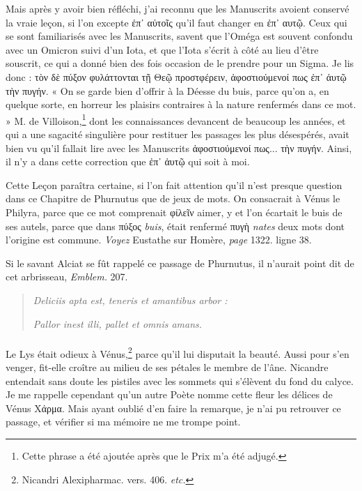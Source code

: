 \documentclass[a4paper, 11pt, oneside, polutonikogreek, french]{article}
\begin{document}
Mais après y avoir bien réfléchi, j'ai reconnu que les Manuscrits avoient conservé la vraie leçon, si l'on excepte ἐπ᾽ αὐτοῖς qu'il faut changer en ἐπ᾽ αυτῷ. Ceux qui se sont familiarisés avec les Manuscrits, savent que l'Oméga est souvent confondu avec un Omicron suivi d'un Iota, et que l'Iota s'écrit à côté au lieu d'être souscrit, ce qui a donné bien des fois occasion de le prendre pour un Sigma. Je lis donc : τὸν δὲ πύξον φυλάττονται τῇ Θεῷ προστφέρειν, ἀφοστιούμενοί πως ἐπ᾿ ἀυτῷ τὴν πυγήν. « On se garde bien d'offrir à la Déesse du buis, parce qu'on a, en quelque sorte, en horreur les plaisirs contraires à la nature renfermés dans ce mot. » M. de Villoison,\footnote{Cette phrase a été ajoutée après que le Prix m'a été adjugé.} dont les connaissances devancent de beaucoup les années, et qui a une sagacité singulière pour restituer les passages les plus désespérés, avait bien vu qu'il fallait lire avec les Manuscrits ἀφοστιούμενοί πως... τὴν πυγήν. Ainsi, il n'y a dans cette correction que ἐπ᾿ ἀυτῷ qui soit à moi.

Cette Leçon paraîtra certaine, si l'on fait attention qu'il n'est presque question dans ce Chapitre de Phurnutus que de jeux de mots. On consacrait à Vénus le Philyra, parce que ce mot comprenait φίλεῖν aimer, y et l'on écartait le buis de ses autels, parce que dans πύξος \emph{buis}, était renfermé πυγὴ \emph{nates} deux mots dont l'origine est commune. \emph{Voyez} Eustathe sur Homère, \emph{page} 1322. ligne 38.

Si le savant Alciat se fût rappelé ce passage de Phurnutus, il n'aurait point dit de cet arbrisseau, \emph{Emblem.} 207.
\begin{quotation}
\emph{Deliciis apta est, teneris et amantibus arbor :}

\hspace*{5mm}\emph{Pallor inest illi, pallet et omnis amans.}
\end{quotation}
\paragraph{}
Le Lys était odieux à Vénus,\footnote{Nicandri Alexipharmac. vers. 406. \emph{etc.}} parce qu'il lui disputait la beauté. Aussi pour s'en venger, fit-elle croître au milieu de ses pétales le membre de l'âne. Nicandre entendait sans doute les pistiles avec les sommets qui s'élèvent du fond du calyce. Je me rappelle cependant qu'un autre Poète nomme cette fleur les délices de Vénus Χάρμα. Mais ayant oublié d'en faire la remarque, je n'ai pu retrouver ce passage, et vérifier si ma mémoire ne me trompe point.
\end{document}
